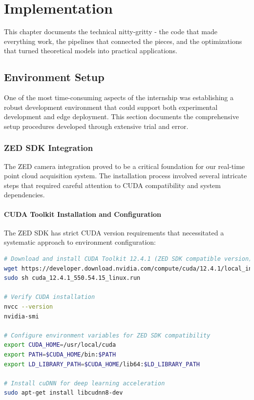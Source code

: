 \documentclass[12pt,a4paper]{report}
\begin{document}
\chapter{Implementation}

This chapter documents the technical nitty-gritty - the code that made everything work, the pipelines that connected the pieces, and the optimizations that turned theoretical models into practical applications.

\section{Environment Setup}

One of the most time-consuming aspects of the internship was establishing a robust development environment that could support both experimental development and edge deployment. This section documents the comprehensive setup procedures developed through extensive trial and error.

\subsection{ZED SDK Integration}

The ZED camera integration proved to be a critical foundation for our real-time point cloud acquisition system. The installation process involved several intricate steps that required careful attention to CUDA compatibility and system dependencies.

\subsubsection{CUDA Toolkit Installation and Configuration}

The ZED SDK has strict CUDA version requirements that necessitated a systematic approach to environment configuration:

\begin{lstlisting}[caption=CUDA Installation and Verification Procedure, label=lst:cuda_setup, language=bash]
# Download and install CUDA Toolkit 12.4.1 (ZED SDK compatible version)
wget https://developer.download.nvidia.com/compute/cuda/12.4.1/local_installers/cuda_12.4.1_550.54.15_linux.run
sudo sh cuda_12.4.1_550.54.15_linux.run

# Verify CUDA installation
nvcc --version
nvidia-smi

# Configure environment variables for ZED SDK compatibility
export CUDA_HOME=/usr/local/cuda
export PATH=$CUDA_HOME/bin:$PATH
export LD_LIBRARY_PATH=$CUDA_HOME/lib64:$LD_LIBRARY_PATH

# Install cuDNN for deep learning acceleration
sudo apt-get install libcudnn8-dev
\end{lstlisting}
\end{document}
